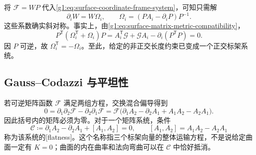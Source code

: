 \ProseParagraphBreak

将 \(\mathcal F=WP\) 代入\eqref{g1:eq:surface-coordinate-frame-system}，可知只需解
\begin{equation}
	\label{g1:eq:surface-orthonormal-frame-system}
	\partial_iW=W\Omega_i,\qquad
	\Omega_i=(PA_i-\partial_iP)P^{-1}.
\end{equation}
这些系数确实斜对称。事实上，由\eqref{g1:eq:surface-matrix-metric-compatibility}，
\[
	P^{\mathsf T}(\Omega_i^{\mathsf T}+\Omega_i)P
	=A_i^{\mathsf T}\mathcal G+\mathcal G A_i-\partial_i(P^{\mathsf T}P)=0.
\]
因 \(P\) 可逆，故 \(\Omega_i^{\mathsf T}=-\Omega_i\)。至此，给定的非正交长度约束已变成一个正交标架系统。

\subsection{Gauss–Codazzi 与平坦性}
\label{g1:subsec:0804:02}

若可逆矩阵函数 \(\mathcal F\) 满足两组方程，交换混合偏导得到
\[
	0=\partial_1\partial_2\mathcal F-\partial_2\partial_1\mathcal F
	=\mathcal F\bigl(\partial_1A_2-\partial_2A_1+A_1A_2-A_2A_1\bigr).
\]
因此括号内的矩阵必须为零。对于一个矩阵系统，条件
\begin{equation}
	\label{g1:eq:surface-flatness}
	\mathcal C\coloneqq\partial_1A_2-\partial_2A_1+[A_1,A_2]=0,
	\qquad [A_1,A_2]=A_1A_2-A_2A_1
\end{equation}
称为该系统的[flatness]。这个名称指三个标架向量的整体运输方程，不是说给定曲面一定有 \(K=0\)；曲面的内在曲率和法向弯曲可以在 \(\mathcal C\) 中恰好抵消。

